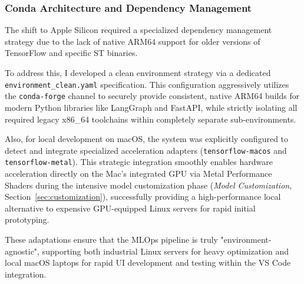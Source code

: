 \subsubsection{Conda Architecture and Dependency Management}

The shift to Apple Silicon required a specialized dependency management strategy due to the lack of native ARM64 support for older versions of TensorFlow and specific ST binaries.

To address this, I developed a clean environment strategy via a dedicated \texttt{environment\_clean.yaml} specification. This configuration aggressively utilizes the \texttt{conda-forge} channel to securely provide consistent, native ARM64 builds for modern Python libraries like LangGraph and FastAPI, while strictly isolating all required legacy x86\_64 toolchains within completely separate sub-environments.

Also, for local development on macOS, the system was explicitly configured to detect and integrate specialized acceleration adapters (\texttt{tensorflow-macos} and \texttt{tensorflow-metal}). This strategic integration smoothly enables hardware acceleration directly on the Mac's integrated GPU via Metal Performance Shaders during the intensive model customization phase (\textit{Model Customization}, Section~\ref{sec:customization}), successfully providing a high-performance local alternative to expensive GPU-equipped Linux servers for rapid initial prototyping.

These adaptations ensure that the MLOps pipeline is truly "environment-agnostic", supporting both industrial Linux servers for heavy optimization and local macOS laptops for rapid UI development and testing within the VS Code integration.
